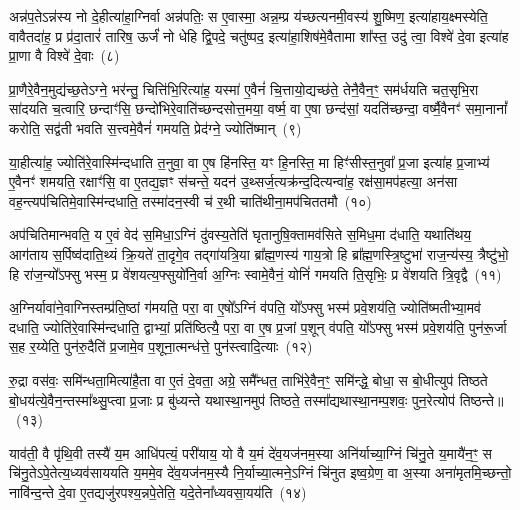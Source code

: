 {}%

अन्न॑प॒ते\-ऽन्न॑स्य नो दे॒हीत्या॑हा॒ग्निर्वा अन्न॑पतिः॒ स ए॒वास्मा॒ अन्न॒म्प्र य॑च्छत्यनमी॒वस्य॑ शु॒ष्मिण॒ इत्या॑हाय॒क्ष्मस्येति॒ वावैतदा॑ह॒ प्र प्र॑दा॒तारं॑ तारिष॒ ऊर्जं॑ नो धेहि द्वि॒पदे॒ चतु॑ष्पद॒ इत्या॑हा॒शिष॑मे॒वैतामा शा᳚स्त॒ उदु॑ त्वा॒ विश्वे॑ दे॒वा इत्या॑ह प्रा॒णा वै विश्वे॑ दे॒वाः~(८)

प्रा॒णैरे॒वैन॒मुद्य॑च्छ॒ते\-ऽग्ने॒ भर॑न्तु॒ चित्ति॑भि॒रित्या॑ह॒ यस्मा॑ ए॒वैनं॑ चि॒त्तायो॒द्यच्छ॑ते॒ तेनै॒वैन॒ꣳ॒ सम॑र्धयति चत॒सृभि॒रा सा॑दयति च॒त्वारि॒ छन्दाꣳ॑सि॒ छन्दो॑भिरे॒वाति॑च्छन्दसोत्त॒मया॒ वर्ष्म॒ वा ए॒षा छन्द॑सां॒ यदति॑च्छन्दा॒ वर्ष्मै॒वैनꣳ॑ समा॒नानां᳚ करोति॒ सद्व॑ती भवति स॒त्त्वमे॒वैनं॑ गमयति॒ प्रेद॑ग्ने॒ ज्योति॑ष्मान्~(९)

या॒हीत्या॑ह॒ ज्योति॑रे॒वास्मि॑न्दधाति त॒नुवा॒ वा ए॒ष हि॑नस्ति॒ यꣳ हि॒नस्ति॒ मा हिꣳ॑सीस्त॒नुवा᳚ प्र॒जा इत्या॑ह प्र॒जाभ्य॑ ए॒वैनꣳ॑ शमयति॒ रक्षाꣳ॑सि॒ वा ए॒तद्य॒ज्ञꣳ स॑चन्ते॒ यदन॑ उ॒थ्सर्ज॒त्यक्र॑न्द॒दित्यन्वा॑ह॒ रक्ष॑सा॒मप॑हत्या॒ अन॑सा वह॒न्त्यप॑चितिमे॒वास्मि॑न्दधाति॒ तस्मा॑दन॒स्वी च॑ र॒थी चाति॑थीना॒मप॑चिततमौ~(१०)

अप॑चितिमान्भवति॒ य ए॒वं वेद॑ स॒मिधा॒\-ऽग्निं दु॑वस्य॒तेति॑ घृतानुषि॒क्तामव॑सिते स॒मिध॒मा द॑धाति॒ यथाति॑थय॒ आग॑ताय स॒र्पिष्व॑दाति॒थ्यं क्रि॒यते॑ ता॒दृगे॒व तद्गा॑यत्रि॒या ब्रा᳚ह्म॒णस्य॑ गाय॒त्रो हि ब्रा᳚ह्म॒णस्त्रि॒ष्टुभा॑ राज॒न्य॑स्य॒ त्रैष्टु॑भो॒ हि रा॑ज॒न्यो᳚\-ऽफ्सु भस्म॒ प्र वे॑शयत्य॒फ्सुयो॑नि॒र्वा अ॒ग्निः स्वामे॒वैनं॒ योनिं॑ गमयति ति॒सृभिः॒ प्र वे॑शयति त्रि॒वृद्वै~(११)

अ॒ग्निर्यावा॑ने॒वाग्निस्तम्प्र॑ति॒ष्ठां ग॑मयति॒ परा॒ वा ए॒षो᳚\-ऽग्निं व॑पति॒ यो᳚\-ऽफ्सु भस्म॑ प्रवे॒शय॑ति॒ ज्योति॑ष्मतीभ्या॒मव॑ दधाति॒ ज्योति॑रे॒वास्मि॑न्दधाति॒ द्वाभ्यां॒ प्रति॑ष्ठित्यै॒ परा॒ वा ए॒ष प्र॒जां प॒शून् व॑पति॒ यो᳚\-ऽफ्सु भस्म॑ प्रवे॒शय॑ति॒ पुन॑रू॒र्जा स॒ह र॒य्येति॒ पुन॑रु॒दैति॑ प्र॒जामे॒व प॒शूना॒त्मन्ध॑त्ते॒ पुन॑स्त्वादि॒त्याः~(१२)

रु॒द्रा वस॑वः॒ समि॑न्धता॒मित्या॑है॒ता वा ए॒तं दे॒वता॒ अग्रे॒ समै᳚न्धत॒ ताभि॑रे॒वैन॒ꣳ॒ समि॑न्द्धे॒ बोधा॒ स बो॒धीत्युप॑ तिष्ठते बो॒धय॑त्ये॒वैन॒न्तस्मा᳚थ्सु॒प्त्वा प्र॒जाः प्र बु॑ध्यन्ते यथास्था॒नमुप॑ तिष्ठते॒ तस्मा᳚द्यथास्था॒नम्प॒शवः॒ पुन॒रेत्योप॑ तिष्ठन्ते॥~(१३)

{}%

याव॑ती॒ वै पृ॑थि॒वी तस्यै॑ य॒म आधि॑पत्यं॒ परी॑याय॒ यो वै य॒मं दे॑व॒यज॑नम॒स्या अनि॑र्याच्या॒ग्निं चि॑नु॒ते य॒मायै॑न॒ꣳ॒ स चि॑नु॒ते\-ऽपे॒तेत्य॒ध्यव॑साययति य॒ममे॒व दे॑व॒यज॑नम॒स्यै नि॒र्याच्या॒त्मने॒\-ऽग्निं चि॑नुत इष्व॒ग्रेण॒ वा अ॒स्या अना॑मृतमि॒च्छन्तो॒ नावि॑न्द॒न्ते दे॒वा ए॒तद्यजु॑रपश्य॒न्नपे॒तेति॒ यदे॒तेना᳚ध्यवसा॒यय॑ति~(१४)

